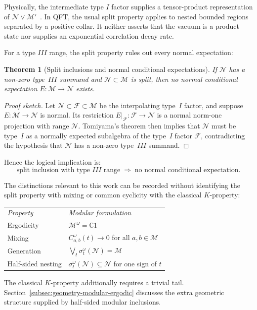 \documentclass[a4paper,11pt]{article}
\newtheorem{theorem}{Theorem}
\theoremstyle{definition}
\begin{document}
\noindent Physically, the intermediate type $I$ factor supplies a tensor-product
representation of $\mathcal N\vee\mathcal M'$~\cite{standardinclusion}.
In QFT, the usual split property applies to nested bounded regions separated
by a positive collar. It neither asserts that the vacuum is a product state
nor supplies an exponential correlation decay rate.

For a type $III$ range, the split property rules out every normal expectation:

\begin{theorem}[Split inclusions and normal conditional expectations]\label{thm:split-no-CE}
If $\mathcal{N}$ has a non-zero type~$III$ summand and $\mathcal{N}\subset\mathcal{M}$
is split, then no normal conditional expectation $E:\mathcal{M}\to\mathcal{N}$ exists.
\end{theorem}

\begin{proof}[Proof sketch]
Let $\mathcal{N}\subset\mathcal{F}\subset\mathcal{M}$ be the interpolating type~$I$
factor, and suppose $E:\mathcal{M}\to\mathcal{N}$ is normal.  Its restriction
$E|_\mathcal{F}:\mathcal{F}\to\mathcal{N}$ is a normal norm-one projection with range
$\mathcal{N}$.  Tomiyama's theorem then implies that $\mathcal{N}$ must be type~$I$ as a
normally expected subalgebra of the type~$I$ factor $\mathcal{F}$, contradicting the
hypothesis that $\mathcal{N}$ has a non-zero type~$III$ summand.
\end{proof}

\noindent Hence the logical implication is:
\begin{equation}
  \text{split inclusion with type~}III\text{ range}
  \;\Longrightarrow\;
  \text{no normal conditional expectation.}
  \label{eq:split-no-CE}
\end{equation}


The distinctions relevant to this work can be recorded without identifying
the split property with mixing or common cyclicity with the classical $K$-property:
\begin{center}
\begin{tabular}{ll}
 \textit{Property} & \textit{Modular formulation}\\[4pt]
 Ergodicity & $\mathcal M^\omega=\mathbb C1$\\
 Mixing & $C_{a,b}^\omega(t)\to0$ for all $a,b\in\mathcal M$\\
 Generation & $\bigvee_t\sigma_t^\omega(\mathcal N)=\mathcal M$\\
 Half-sided nesting & $\sigma_t^\omega(\mathcal N)\subseteq\mathcal N$ for one sign of $t$
\end{tabular}
\end{center}
The classical $K$-property additionally requires a trivial tail. Section~\ref{subsec:geometry-modular-ergodic}
discusses the extra geometric structure supplied by half-sided modular inclusions.
\end{document}
